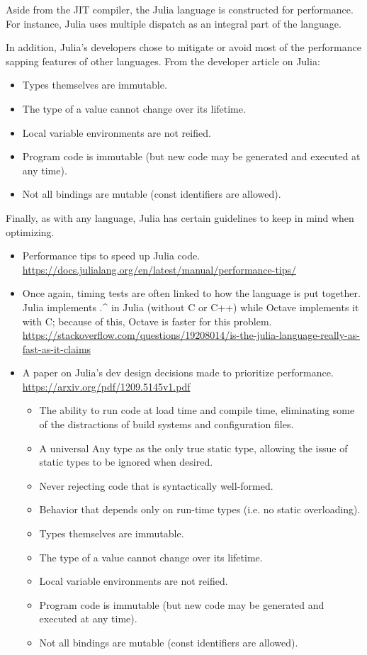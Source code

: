 \documentclass[10pt]{article}
\begin{document}
Aside from the JIT compiler, the Julia language is constructed for performance. For instance, Julia uses multiple dispatch as an integral part of the language. 

In addition, Julia's developers chose to mitigate or avoid most of the performance sapping features of other languages. From the developer article on Julia\cite{juliadevs}:
\begin{itemize}
	\item Types themselves are immutable.
    \item The type of a value cannot change over its lifetime.
    \item Local variable environments are not reified.
    \item Program code is immutable (but new code may be generated and executed at any time).
    \item Not all bindings are mutable (const identifiers are allowed).
\end{itemize}

Finally, as with any language, Julia has certain guidelines to keep in mind when optimizing. 

\fxnote{---}

\begin{itemize}
\item Performance tips to speed up Julia code. 
\url{https://docs.julialang.org/en/latest/manual/performance-tips/} 

\item Once again, timing tests are often linked to how the language is put together. Julia implements .\string^ in Julia (without C or C++) while Octave implements it with C; because of this, Octave is faster for this problem. \url{https://stackoverflow.com/questions/19208014/is-the-julia-language-really-as-fast-as-it-claims}

\item A paper on Julia’s dev design decisions made to prioritize performance.
\url{https://arxiv.org/pdf/1209.5145v1.pdf}
\begin{itemize}
\item The ability to run code at load time and compile time, eliminating some of the distractions
of build systems and configuration files.
\item A universal Any type as the only true static type, allowing the issue of static types to be
ignored when desired.
\item Never rejecting code that is syntactically well-formed.
\item Behavior that depends only on run-time types (i.e. no static overloading).
\item Types themselves are immutable.
\item The type of a value cannot change over its lifetime.
\item Local variable environments are not reified.
\item Program code is immutable (but new code may be generated and executed at any time).
\item Not all bindings are mutable (const identifiers are allowed).
\end{itemize}
\end{itemize}
\end{document}
